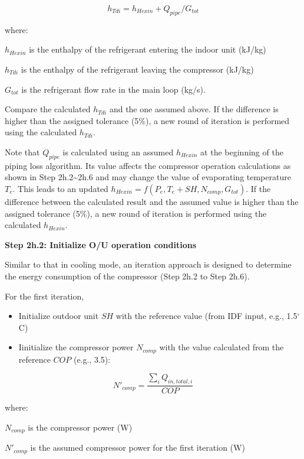 \begin{equation}
h_{Tdi} = h_{Hexin}+Q_{pipe}/G_{tot}
\end{equation}

where:

\(h_{Hexin}\) is the enthalpy of the refrigerant entering the indoor unit (kJ/kg)

\(h_{Tdi}\) is the enthalpy of the refrigerant leaving the compressor (kJ/kg)

\(G_{tot}\) is the refrigerant flow rate in the main loop (kg/s).

Compare the calculated \(h_{Tdi}\) and the one assumed above. If the difference is higher than the assigned tolerance (5\%), a new round of iteration is performed using the calculated \(h_{Tdi}\).

Note that \(Q_{pipe}\) is calculated using an assumed \(h_{Hexin}\) at the beginning of the piping loss algorithm. Its value affects the compressor operation calculations as shown in Step 2h.2\textasciitilde{}2h.6 and may change the value of evaporating temperature \(T_e\). This leads to an updated \(h_{Hexin} = f(P_e,T_e+SH,N_{comp},G_{tot})\). If the difference between the calculated result and the assumed value is higher than the assigned tolerance (5\%), a new round of iteration is performed using the calculated \(h_{Hexin}\).

\textbf{Step 2h.2: Initialize O/U operation conditions}

Similar to that in cooling mode, an iteration approach is designed to determine the energy consumption of the compressor (Step 2h.2 to Step 2h.6).

For the first iteration,

\begin{itemize}
\item
  Initialize outdoor unit \(SH\) with the reference value (from IDF input, e.g., 1.5\(^{\circ}\)C)
\item
  Iinitialize the compressor power \(N_{comp}\) with the value calculated from the reference \(COP\) (e.g., 3.5):
\end{itemize}

\begin{equation}
N'_{comp} = \frac{\sum_iQ_{in,total,i}}{COP}
\end{equation}

where:

\(N_{comp}\) is the compressor power (W)

\(N'_{comp}\) is the assumed compressor power for the first iteration (W)

